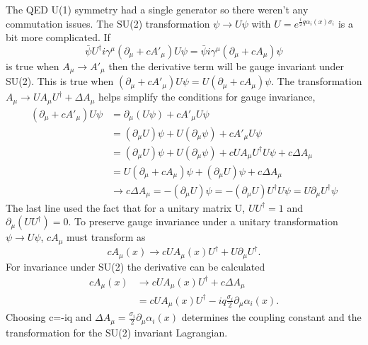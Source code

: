 The QED U(1) symmetry had a single generator so there weren't any commutation issues. The SU(2) transformation $\psi \rightarrow U\psi$ with $U = e^{\frac{i}{2}q\alpha_i(x)\sigma_i}$ is a bit more complicated. If 
\begin{equation}
\bar{\psi}U^\dagger i\gamma^\mu\left(\partial_\mu + cA'_{\mu}\right)U\psi = \bar{\psi}i\gamma^\mu\left(\partial_\mu + cA_{\mu}\right)\psi 
\end{equation}
is true when $A_\mu \rightarrow A'_\mu$ then the derivative term will be gauge invariant under SU(2). This is true when $\left(\partial_\mu + cA'_{\mu}\right)U\psi =U\left(\partial_\mu + cA_{\mu}\right)\psi$. The transformation $A_\mu \rightarrow UA_\mu U^\dagger + \Delta A_{\mu}$ helps simplify the conditions for gauge invariance, 
\begin{equation}
\begin{split}
\left(\partial_\mu + cA'_{\mu}\right)U\psi &=  \partial_\mu(U\psi) + cA'_{\mu}U\psi \\
& = (\partial_\mu U)\psi + U(\partial_\mu\psi) + cA'_{\mu}U\psi \\ 
& = (\partial_\mu U)\psi + U(\partial_\mu\psi) + cUA_{\mu}U^\dagger U\psi + c\Delta A_{\mu} \\
& = U\left(\partial_\mu + cA_{\mu}\right)\psi + (\partial_\mu U)\psi + c\Delta A_{\mu} \\
& \rightarrow c\Delta A_{\mu} = -(\partial_\mu U)\psi = - (\partial_\mu U)U^\dagger U\psi = U\partial_\mu U^\dagger\psi
\end{split}
\end{equation}
The last line used the fact that for a unitary matrix U, $UU^\dagger = 1$ and $\partial_\mu(UU^\dagger) = 0$. To preserve gauge invariance under a unitary transformation $\psi \rightarrow U\psi$, $cA_\mu$ must transform as
\begin{equation}
cA_\mu(x) \rightarrow cUA_\mu(x)U^\dagger + U\partial_\mu U^\dagger .
\end{equation}
For invariance under SU(2) the derivative can be calculated
\begin{equation}
\begin{split}
cA_\mu(x) &\rightarrow cUA_\mu(x)U^\dagger + c\Delta A_\mu \\ 
&= cUA_\mu(x)U^\dagger - iq\frac{\sigma_i}{2}\partial_\mu\alpha_i(x).
\end{split}
\end{equation}
Choosing c=-iq and $\Delta A_\mu = \frac{\sigma_i}{2}\partial_\mu\alpha_i(x)$ determines the coupling constant and the transformation for the SU(2) invariant Lagrangian.


